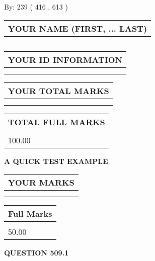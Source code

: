 \documentclass[12pt]{article}
\begin{document}
   
\hspace{1.0in} By: 
 239 ( 416 ,  613 )
   
   
   
   
\newpage 
\setcounter{page}{ 
   509001 } 
   
   
   
   
\noindent\begin{tabular}{|l|}
\hline
YOUR NAME (FIRST, ... LAST)  \\
\hline
 \\ 
 \\ 
\hline
\end{tabular}
\hspace{0.05in} \begin{tabular}{|l|}
\hline
 YOUR   ID   INFORMATION  \\
\hline
 \\ 
 \\ 
\hline
\end{tabular}
   
   
\vspace{0.2in}\noindent\begin{tabular}{|l|}
\hline
YOUR TOTAL MARKS  \\
\hline
 \\ 
 \\ 
\hline
\end{tabular}
\hspace{0.05in} \begin{tabular}{|l|}
\hline
TOTAL FULL MARKS  \\
\hline
 \\ 
100.00 \\
\hline
\end{tabular}
   
   
 \vspace{0.2in}
{\LARGE {\textbf{ A QUICK TEST EXAMPLE}}}
   
   
  
\vspace{0.2in}
  
\noindent\begin{tabular}{|l|}
\hline
 YOUR MARKS  \\
\hline
 \\ 
 \\ 
\hline
\end{tabular}
\hspace{0.05in} \begin{tabular}{|l|}
\hline
 Full Marks  \\
\hline
 \\ 
50.00 \\
\hline
\end{tabular}
{\textbf{\Large{QUESTION
509.1 
}}}
  
\end{document}
